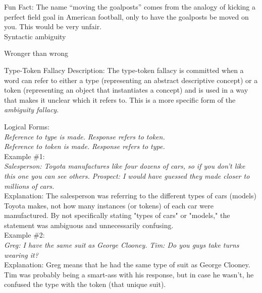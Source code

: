 \documentclass[a4paper,12pt,single,pdftex]{scrbook}
\begin{document}
    
      Fun Fact: The name “moving the goalposts” comes from the analogy of kicking a perfect field goal in American football, only to have the goalposts be moved on you. This would be very unfair.
    \\

  

Syntactic ambiguity

Wronger than wrong

Type-Token Fallacy
    Description: The type-token fallacy is committed when a word can refer to either a type (representing an abstract descriptive concept) or a token (representing an object that instantiates a concept) and is used in a way that makes it unclear which it refers to. This is a more specific form of the {\it ambiguity fallacy}.

    
      Logical Forms:
    \\

    
      {\em Reference to type is made.} \newline
{\em Response refers to token.}
    \\

    
      {\em Reference to token is made.} \newline
{\em Response refers to type.}
    \\

    
      Example \#1:
    \\

    
      {\em Salesperson: Toyota manufactures like four dozens of cars, so if you don't like this one you can see others. \newline
Prospect: I would have guessed they made closer to millions of cars.}
    \\

    
      Explanation: The salesperson was referring to the different types of cars (models) Toyota makes, not how many instances (or tokens) of each car were manufactured. By not specifically stating "types of cars" or "models," the statement was ambiguous and unnecessarily confusing.
    \\

    
      Example \#2:
    \\

    
      {\em Greg: I have the same suit as George Clooney.} \newline
{\em Tim: Do you guys take turns wearing it?}
    \\

    
      Explanation: Greg means that he had the same type of suit as George Clooney. Tim was probably being a smart-ass with his response, but in case he wasn’t, he confused the type with the token (that unique suit).
    \\
\end{document}
